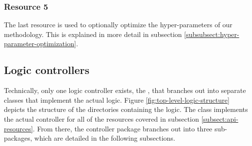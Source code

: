 \documentclass[12pt,a4paper]{report}
\begin{document}
\subsubsection{Resource 5}
The last resource is used to optionally optimize the
hyper\hyp parameters of our methodology. This is explained in more detail in
subsection \ref{subsubsect:hyper-parameter-optimization}.


\subsection{Logic controllers}

Technically, only one logic controller exists, the ,
that branches out into separate classes that implement the actual logic. Figure
\ref{fig:top-level-logic-structure} depicts the structure of the directories
containing the logic. The  class implements the actual
controller for all of the  resources covered in subsection
\ref{subsect:api-resources}. From there, the  controller package
branches out into three sub-packages, which are detailed in the following
subsections.
\end{document}
